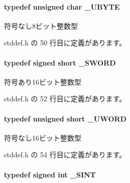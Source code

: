 \paragraph[{\+\_\+\+U\+B\+Y\+T\+E}]{\setlength{\rightskip}{0pt plus 5cm}typedef unsigned char {\bf \+\_\+\+U\+B\+Y\+T\+E}}\label{stddef_8h_aac464b47452ce9406f88ef194e2becc1_aac464b47452ce9406f88ef194e2becc1}


符号なし8ビット整数型 



 stddef.\+h の 50 行目に定義があります。

\paragraph[{\+\_\+\+S\+W\+O\+R\+D}]{\setlength{\rightskip}{0pt plus 5cm}typedef signed short {\bf \+\_\+\+S\+W\+O\+R\+D}}\label{stddef_8h_a2c7cee059ec16036635c7e5500eb5e5d_a2c7cee059ec16036635c7e5500eb5e5d}


符号あり16ビット整数型 



 stddef.\+h の 52 行目に定義があります。

\paragraph[{\+\_\+\+U\+W\+O\+R\+D}]{\setlength{\rightskip}{0pt plus 5cm}typedef unsigned short {\bf \+\_\+\+U\+W\+O\+R\+D}}\label{stddef_8h_af4b45f5ec97da370bd2173b4fe891d76_af4b45f5ec97da370bd2173b4fe891d76}


符号なし16ビット整数型 



 stddef.\+h の 54 行目に定義があります。

\paragraph[{\+\_\+\+S\+I\+N\+T}]{\setlength{\rightskip}{0pt plus 5cm}typedef signed int {\bf \+\_\+\+S\+I\+N\+T}}\label{stddef_8h_aefd1068e35d26c0e7d7079ddf2579174_aefd1068e35d26c0e7d7079ddf2579174}


